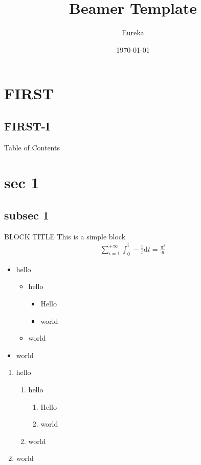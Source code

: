 \documentclass[aspectratio=169]{beamer}
\title{Beamer Template}
\author{Eureka}
\date{\today}
\begin{document}
\section{FIRST}
\subsection{FIRST-I}
  \begin{frame}%
    \titlepage
  \end{frame}
  
  \begin{frame}{Table of Contents}
    \tableofcontents
  \end{frame}

  \section{sec 1}
  \subsection{subsec 1}
  \begin{frame}
    \begin{block}{BLOCK TITLE}
      This is a simple block %
      \begin{align}
        \sum_{i=1}^{+\infty}{\int_{0}^{i}-\frac{1}{t}\mathrm{d}t} = \frac{\pi^2}{6}
      \end{align}
    \end{block}
  \end{frame} 
  \begin{frame}
    \begin{multicols}{2}
      \begin{itemize}
        \item hello
        \begin{itemize}
          \item hello 
          \begin{itemize}
            \item Hello 
            \item world
          \end{itemize}
          \item world
        \end{itemize} 
        \item world
      \end{itemize}

      \begin{enumerate}
        \item hello
        \begin{enumerate}
          \item hello 
          \begin{enumerate}
            \item Hello 
            \item world
          \end{enumerate}
          \item world
        \end{enumerate} 
        \item world
      \end{enumerate}
    \end{multicols}
  \end{frame}
\end{document}
